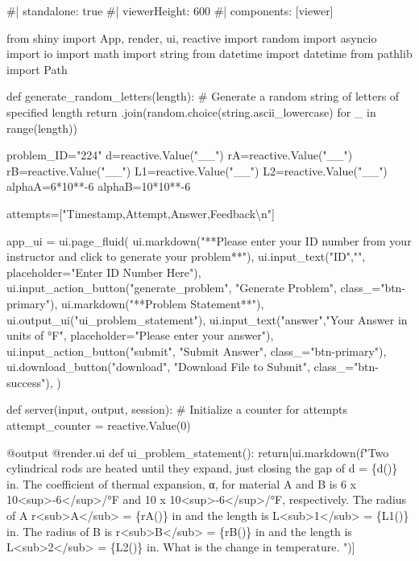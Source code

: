 \documentclass[
  letterpaper,
  DIV=11,
  numbers=noendperiod]{scrreprt}
\newenvironment{Shaded}{\begin{snugshade}}{\end{snugshade}}
\newcommand{\NormalTok}[1]{\textcolor[rgb]{0.00,0.23,0.31}{#1}}
\begin{document}
\begin{Shaded}
\begin{Highlighting}[]
\NormalTok{\#| standalone: true}
\NormalTok{\#| viewerHeight: 600}
\NormalTok{\#| components: [viewer]}

\NormalTok{from shiny import App, render, ui, reactive}
\NormalTok{import random}
\NormalTok{import asyncio}
\NormalTok{import io}
\NormalTok{import math}
\NormalTok{import string}
\NormalTok{from datetime import datetime}
\NormalTok{from pathlib import Path}

\NormalTok{def generate\_random\_letters(length):}
\NormalTok{    \# Generate a random string of letters of specified length}
\NormalTok{    return \textquotesingle{}\textquotesingle{}.join(random.choice(string.ascii\_lowercase) for \_ in range(length)) }

\NormalTok{problem\_ID="224"}
\NormalTok{d=reactive.Value("\_\_")}
\NormalTok{rA=reactive.Value("\_\_")}
\NormalTok{rB=reactive.Value("\_\_")}
\NormalTok{L1=reactive.Value("\_\_")}
\NormalTok{L2=reactive.Value("\_\_")}
\NormalTok{alphaA=6*10**{-}6}
\NormalTok{alphaB=10*10**{-}6}

\NormalTok{attempts=["Timestamp,Attempt,Answer,Feedback\textbackslash{}n"]}

\NormalTok{app\_ui = ui.page\_fluid(}
\NormalTok{    ui.markdown("**Please enter your ID number from your instructor and click to generate your problem**"),}
\NormalTok{    ui.input\_text("ID","", placeholder="Enter ID Number Here"),}
\NormalTok{    ui.input\_action\_button("generate\_problem", "Generate Problem", class\_="btn{-}primary"),}
\NormalTok{    ui.markdown("**Problem Statement**"),}
\NormalTok{    ui.output\_ui("ui\_problem\_statement"),}
\NormalTok{    ui.input\_text("answer","Your Answer in units of °F", placeholder="Please enter your answer"),}
\NormalTok{    ui.input\_action\_button("submit", "Submit Answer", class\_="btn{-}primary"),}
\NormalTok{    ui.download\_button("download", "Download File to Submit", class\_="btn{-}success"),}
\NormalTok{)}


\NormalTok{def server(input, output, session):}
\NormalTok{    \# Initialize a counter for attempts}
\NormalTok{    attempt\_counter = reactive.Value(0)}

\NormalTok{    @output}
\NormalTok{    @render.ui}
\NormalTok{    def ui\_problem\_statement():}
\NormalTok{        return[ui.markdown(f"Two cylindrical rods are heated until they expand, just closing the gap of d = \{d()\} in. The coefficient of thermal expansion, α, for material A and B is 6 x 10\textless{}sup\textgreater{}{-}6\textless{}/sup\textgreater{}/°F and 10 x 10\textless{}sup\textgreater{}{-}6\textless{}/sup\textgreater{}/°F, respectively. The radius of A r\textless{}sub\textgreater{}A\textless{}/sub\textgreater{} = \{rA()\} in and the length is L\textless{}sub\textgreater{}1\textless{}/sub\textgreater{} = \{L1()\} in. The radius of B is r\textless{}sub\textgreater{}B\textless{}/sub\textgreater{} = \{rB()\} in and the length is L\textless{}sub\textgreater{}2\textless{}/sub\textgreater{} = \{L2()\} in. What is the change in temperature.  ")]}
    

\end{Highlighting}
\end{Shaded}
\end{document}

